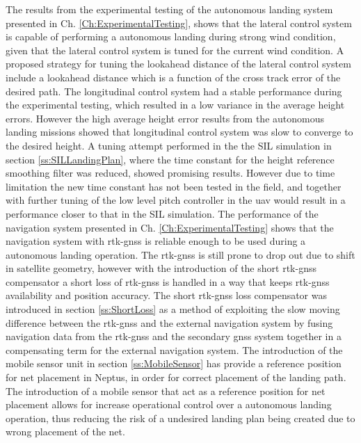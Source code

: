The results from the experimental testing of the autonomous landing system presented in Ch. \ref{Ch:ExperimentalTesting}, shows that the lateral control system is capable of performing a autonomous landing during strong wind condition, given that the lateral control system is tuned for the current wind condition. A proposed strategy for tuning the lookahead distance of the lateral control system include a lookahead distance which is a function of the cross track error of the desired path. The longitudinal control system had a stable performance during the experimental testing, which resulted in a low variance in the average height errors. However the high average height error results from the autonomous landing missions showed that longitudinal control system was slow to converge to the desired height. A tuning attempt performed in the the SIL simulation in section \ref{ss:SILLandingPlan}, where the time constant for the height reference smoothing filter was reduced, showed promising results. However due to time limitation the new time constant has not been tested in the field, and together with further tuning of the low level pitch controller in the \gls{uav} would result in a performance closer to that in the SIL simulation.
The performance of the navigation system presented in Ch. \ref{Ch:ExperimentalTesting} shows that the navigation system with \gls{rtk-gnss} is reliable enough to be used during a autonomous landing operation. The \gls{rtk-gnss} is still prone to drop out due to shift in satellite geometry, however with the introduction of the short \gls{rtk-gnss} compensator a short loss of \gls{rtk-gnss} is handled in a way that keeps \gls{rtk-gnss} availability and position accuracy. The short \gls{rtk-gnss} loss compensator was introduced in section \ref{ss:ShortLoss} as a method of exploiting the slow moving difference between the \gls{rtk-gnss} and the external navigation system by fusing navigation data from the \gls{rtk-gnss} and the secondary \gls{gnss} system together in a compensating term for the external navigation system.
The introduction of the mobile sensor unit in section \ref{ss:MobileSensor} has provide a reference position for net placement in Neptus, in order for correct placement of the landing path. The introduction of a mobile sensor that act as a reference position for net placement allows for increase operational control over a autonomous landing operation, thus reducing the risk of a undesired landing plan being created due to wrong placement of the net.
